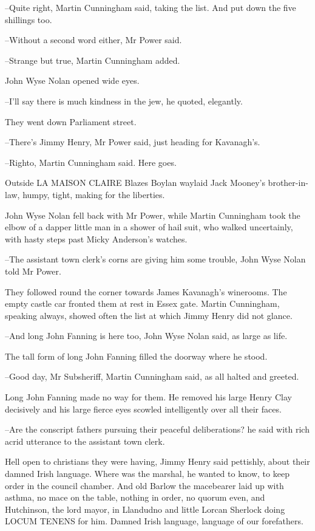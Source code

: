 --Quite right,
Martin Cunningham said,
taking the list.
And put down the
five shillings too.

--Without a second word either,
Mr Power said.

--Strange but true,
Martin Cunningham added.

John Wyse Nolan opened wide eyes.

--I'll say there is much kindness in the jew,
he quoted, elegantly.

They went down Parliament street.

--There's Jimmy Henry,
Mr Power said,
just heading for Kavanagh's.

--Righto,
Martin Cunningham said.
Here goes.

Outside LA MAISON CLAIRE
Blazes Boylan waylaid Jack Mooney's brother-in-
law,
humpy, tight,
making for the liberties.

John Wyse Nolan fell back with Mr Power,
while Martin Cunningham took the
elbow of a dapper little man in a shower of hail suit,
who walked
uncertainly,
with hasty steps past Micky Anderson's watches.

--The assistant town clerk's corns are giving him some trouble,
John Wyse Nolan told Mr Power.%

They followed round the corner
towards James Kavanagh's winerooms.
The
empty castle car fronted them at rest in Essex gate.
Martin Cunningham,
speaking always,
showed often the list at which Jimmy Henry did not
glance.

--And long John Fanning is here too,
John Wyse Nolan said,
as large as
life.

The tall form of long John Fanning
filled the doorway where he stood.

--Good day, Mr Subsheriff,
Martin Cunningham said,
as all halted and greeted.%

Long John Fanning made no way for them.
He removed his large Henry Clay decisively
and his large fierce eyes scowled intelligently over all their faces.

--Are the conscript fathers pursuing their peaceful deliberations?
he said with rich acrid utterance
to the assistant town clerk.

Hell open to christians they were having,
Jimmy Henry said pettishly,
about their damned Irish language.
Where was the marshal,
he wanted to
know,
to keep order in the council chamber.
And old Barlow the macebearer
laid up with asthma,
no mace on the table,
nothing in order,
no quorum even,
and Hutchinson, the lord mayor, in Llandudno
and little Lorcan
Sherlock doing LOCUM TENENS for him.
Damned Irish language,
language of
our forefathers.

